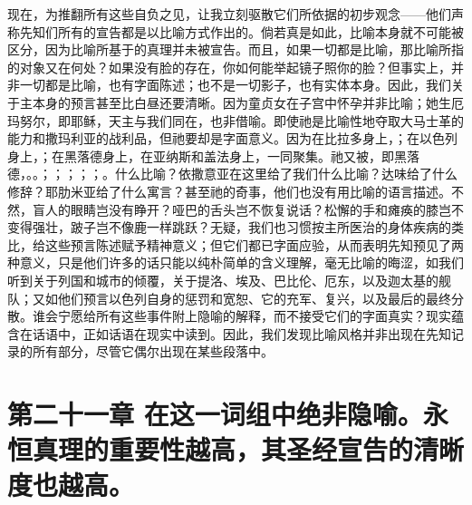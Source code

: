 现在，为推翻所有这些自负之见，让我立刻驱散它们所依据的初步观念——他们声称先知们所有的宣告都是以比喻方式作出的。倘若真是如此，比喻本身就不可能被区分，因为比喻所基于的真理并未被宣告。而且，如果一切都是比喻，那比喻所指的对象又在何处？如果没有脸的存在，你如何能举起镜子照你的脸？但事实上，并非一切都是比喻，也有字面陈述；也不是一切影子，也有实体本身。因此，我们关于主本身的预言甚至比白昼还要清晰。因为童贞女在子宫中怀孕并非比喻；她生厄玛努尔，即耶稣，天主与我们同在，也非借喻。即使祂是比喻性地夺取大马士革的能力和撒玛利亚的战利品，但祂要却是字面意义。因为在比拉多身上，；在以色列身上，；在黑落德身上，在亚纳斯和盖法身上，一同聚集。祂又被，即黑落德，。。；；；；；。什么比喻？依撒意亚在这里给了我们什么比喻？达味给了什么修辞？耶肋米亚给了什么寓言？甚至祂的奇事，他们也没有用比喻的语言描述。不然，盲人的眼睛岂没有睁开？哑巴的舌头岂不恢复说话？松懈的手和瘫痪的膝岂不变得强壮，跛子岂不像鹿一样跳跃？无疑，我们也习惯按主所医治的身体疾病的类比，给这些预言陈述赋予精神意义；但它们都已字面应验，从而表明先知预见了两种意义，只是他们许多的话只能以纯朴简单的含义理解，毫无比喻的晦涩，如我们听到关于列国和城市的倾覆，关于提洛、埃及、巴比伦、厄东，以及迦太基的舰队；又如他们预言以色列自身的惩罚和宽恕、它的充军、复兴，以及最后的最终分散。谁会宁愿给所有这些事件附上隐喻的解释，而不接受它们的字面真实？现实蕴含在话语中，正如话语在现实中读到。因此，我们发现比喻风格并非出现在先知记录的所有部分，尽管它偶尔出现在某些段落中。\par


\section{第二十一章 在这一词组中绝非隐喻。永恒真理的重要性越高，其圣经宣告的清晰度也越高。}

